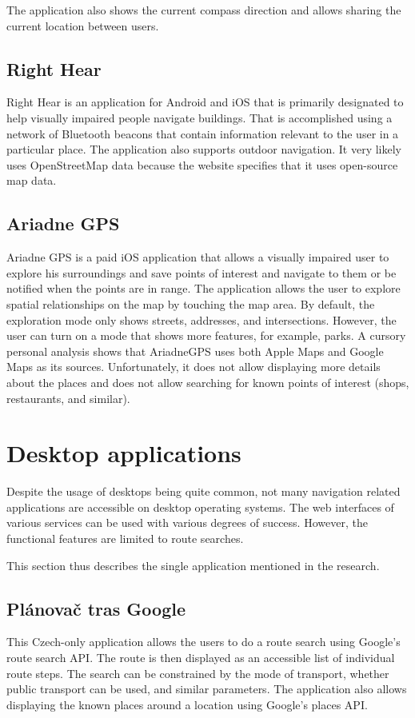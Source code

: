 \documentclass[nolof,digital]{fithesis3}
\begin{document}
The application also shows the current compass direction and allows sharing the current location between users.
\subsection{Right Hear}
Right Hear \parencite{righthear} is an application for Android and iOS that is primarily designated to help visually impaired people navigate buildings. That is accomplished using a network of Bluetooth beacons that contain information relevant to the user in a particular place. The application also supports outdoor navigation. It very likely uses OpenStreetMap data because the website specifies that it uses open-source map data.
\subsection{Ariadne GPS}
Ariadne GPS \parencite{ariadnegps} is a paid iOS application that allows a visually impaired user to explore his surroundings and save points of interest and navigate to them or be notified when the points are in range. The application allows the user to explore spatial relationships on the map by touching the map area. By default, the exploration mode only shows streets, addresses, and intersections. However, the user can turn on a mode that shows more features, for example, parks. A cursory personal analysis shows that AriadneGPS uses both Apple Maps and Google Maps as its sources. Unfortunately, it does not allow displaying more details about the places and does not allow searching for known points of interest (shops, restaurants, and similar).
\section{Desktop applications}
Despite the usage of desktops being quite common, not many navigation related applications are accessible on desktop operating systems. The web interfaces of various services can be used with various degrees of success. However, the functional features are limited to route searches.

This section thus describes the single application mentioned in the research.
\subsection{Plánovač tras Google}
This Czech-only application \parencite{ptg} allows the users to do a route search using Google's route search API. The route is then displayed as an accessible list of individual route steps. The search can be constrained by the mode of transport, whether public transport can be used, and similar parameters. The application also allows displaying the known places around a location using Google's places API.
\end{document}

